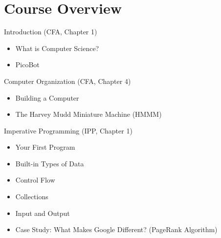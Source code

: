 \documentclass[8pt,a4paper,compress]{beamer}
\begin{document}
\section{Course Overview}

\begin{frame}[fragile]
\pause

Introduction (CFA, Chapter 1)
\begin{itemize}
\item What is Computer Science?
\item PicoBot
\end{itemize}

\pause
\bigskip

Computer Organization (CFA, Chapter 4)
\begin{itemize}
\item Building a Computer
\item The Harvey Mudd Miniature Machine (HMMM)
\end{itemize}

\pause
\bigskip

Imperative Programming (IPP, Chapter 1)
\begin{itemize}
\item Your First Program
\item Built-in Types of Data
\item Control Flow
\item Collections
\item Input and Output
\item Case Study: What Makes Google Different? (PageRank Algorithm)
\end{itemize}
\end{frame}
\end{document}
